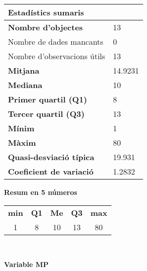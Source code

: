 \begin{center}
\begin{tabular}{|l|l|}
\hline
\multicolumn{2}{|l|}{\bf Estad\'istics sumaris } \\ 
\hline
\hline
{\bf Nombre d'objectes} & 13 \\ 
{\small\hspace{3ex} Nombre de dades mancants} & 0 \\ 
{\small\hspace{3ex} Nombre d'observacions \'utils} & 13 \\ 
{\bf Mitjana} & 14.9231 \\ 
{\bf Mediana} & 10 \\ 
{\bf Primer quartil (Q1)} & 8 \\ 
{\bf Tercer quartil (Q3)} & 13 \\ 
{\bf M\'inim} & 1 \\ 
{\bf M\`axim} & 80 \\ 
{\bf Quasi-desviaci\'o t\'ipica} & 19.931 \\ 
{\bf Coeficient de variaci\'o} & 1.2832 \\ 
\hline
\end{tabular}
\end{center} \vfill

\begin{center} \bf Resum en 5 n\'umeros \end{center} 
\begin{center}
\begin{tabular}{c c c c c}
{\bf min} & {\bf Q1} & {\bf Me } & {\bf Q3} & {\bf max} \\
1 & 8 & 10 & 13 & 80 \\
\end{tabular}
\end{center} \vfill

\vspace{3ex}
\mbox{ } \vfill
\begin{center} \Large \bf Variable MP \end{center}

